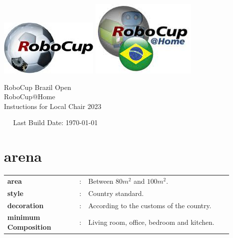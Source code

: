 \documentclass[11pt, twoside, openright, a4paper, chapterprefix]{article}
\begin{document}
\begin{titlepage}
    \begin{center}
      {
        \includegraphics[width=.25\textwidth]{images/logo_RoboCupFed.jpg}
        \hfill
        \includegraphics[width=.23\textwidth]{images/logo_rcbrazilhome.png}\\
        [1.23ex]
      }
      \vspace{2.7 cm}
      \hrulefill\par
      {%
        \vspace*{.27cm}
        \Huge{RoboCup Brazil Open}\\[1.23ex]
        \Huge{RoboCup@Home}\\[1.23ex]
        \Large Instuctions for Local Chair 2023\\[2ex]
      }
      \hrulefill\par
      \vfill
      ~~ Last Build Date: \today \quad 
      \vfill
    \end{center}
  \end{titlepage}


% 
% 
% 

\clearpage




\section{arena}

\begin{tabular}{ p{0.3\linewidth} p{0.01\linewidth} p{0.6\linewidth}}
    \textbf{area}                 & : & Between $80m^2$ and $100m^2$. \\
    \textbf{style}                & : & Country standard. \\
    \textbf{decoration}           & : & According to the customs of the country. \\
    \textbf{minimum Composition}  & : & Living room, office, bedroom and kitchen.
\end{tabular}
\end{document}
